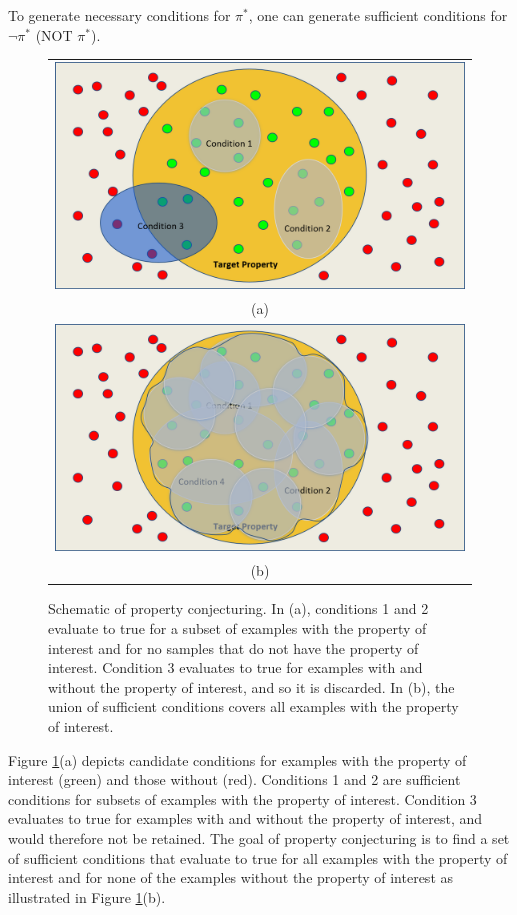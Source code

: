 \documentclass[ijds,nonblindrev]{informs-ijds}
\begin{document}
To generate necessary conditions for $\pi^*$, one can generate sufficient conditions for $\neg \pi^*$ (NOT $\pi^*$).


\begin{figure}
\begin{tabular}{c}
\includegraphics[width=5.0in]{conjecturing_prop_1.jpg} \\
(a) \\
\includegraphics[width=5.0in]{conjecturing_prop_2.jpg}\\
(b)
\end{tabular}
\caption{\label{conjecturing_prop}Schematic of property conjecturing.  In (a), conditions 1 and 2 evaluate to true for a subset of examples with the property of interest and for no samples that do not have the property of interest.  Condition 3 evaluates to true for examples with and without the property of interest, and so it is discarded.  In (b), the union of sufficient conditions  covers all examples with the property of interest.}
\end{figure}

Figure \ref{conjecturing_prop}(a) depicts candidate conditions for examples with the property of interest (green) and those without (red).  Conditions 1 and 2 are sufficient conditions for subsets of examples with the property of interest.  Condition 3 evaluates to true for examples with and without the property of interest, and would therefore not be retained.  The goal of property conjecturing is to find a set of sufficient conditions that evaluate to true for all examples with the property of interest and for none of the examples without the property of interest as illustrated in Figure \ref{conjecturing_prop}(b).
\end{document}
